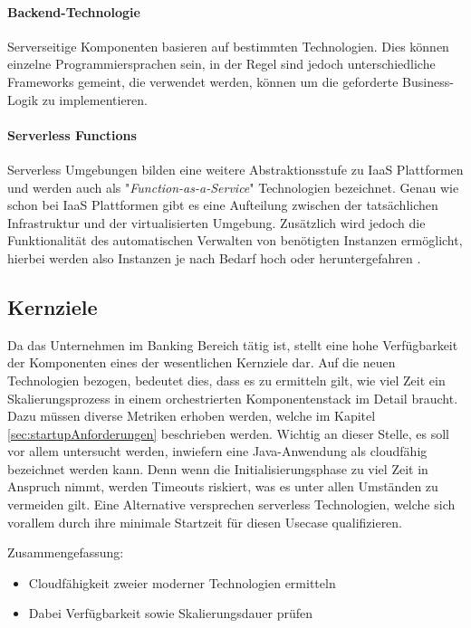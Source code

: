 \paragraph{Backend-Technologie}
Serverseitige Komponenten basieren auf bestimmten Technologien. Dies können einzelne Programmiersprachen sein, in der Regel sind jedoch unterschiedliche Frameworks gemeint, die verwendet werden, können um die geforderte Business-Logik zu implementieren.

\paragraph{Serverless Functions}
Serverless Umgebungen bilden eine weitere Abstraktionsstufe zu IaaS Plattformen und werden auch als "\emph{Function-as-a-Service}" Technologien bezeichnet. Genau wie schon bei IaaS Plattformen gibt es eine Aufteilung zwischen der tatsächlichen Infrastruktur und der virtualisierten Umgebung. Zusätzlich wird jedoch die Funktionalität des automatischen Verwalten von benötigten Instanzen ermöglicht, hierbei werden also Instanzen je nach Bedarf hoch oder heruntergefahren \cite[Seite~70 ff.]{continuous-delivery}.

\subsection{Kernziele \checkmark \checkmark}
\label{ss:kernziele}
Da das Unternehmen im Banking Bereich tätig ist, stellt eine hohe Verfügbarkeit der Komponenten eines der wesentlichen Kernziele dar. Auf die neuen Technologien bezogen, bedeutet dies, dass es zu ermitteln gilt, wie viel Zeit ein Skalierungsprozess in einem orchestrierten Komponentenstack im Detail braucht. Dazu müssen diverse Metriken erhoben werden, welche im Kapitel \ref{sec:startupAnforderungen} beschrieben werden. Wichtig an dieser Stelle, es soll vor allem untersucht werden, inwiefern eine Java-Anwendung als cloudfähig bezeichnet werden kann. Denn wenn die Initialisierungsphase zu viel Zeit in Anspruch nimmt, werden Timeouts riskiert, was es unter allen Umständen zu vermeiden gilt. Eine Alternative versprechen serverless Technologien, welche sich vorallem durch ihre minimale Startzeit für diesen Usecase qualifizieren.

Zusammengefassung: 
\begin{itemize}
  \item Cloudfähigkeit zweier moderner Technologien ermitteln
  \item Dabei Verfügbarkeit sowie Skalierungsdauer prüfen
\end{itemize}



